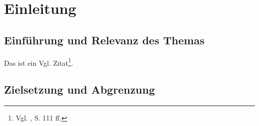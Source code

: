 \section{Einleitung}
\subsection{Einführung und Relevanz des Themas}
Das ist ein Vgl. Zitat\footnote{Vgl. \cite{Balzert2008}, S. 111 ff.}.
%

\subsection{Zielsetzung und Abgrenzung}

